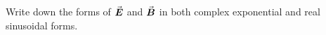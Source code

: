 

\vspace*{\fill}
\centering

Write down the forms of $\va*{E}$ and $\va*{B}$ in both complex exponential and real sinusoidal forms.

\centering
\vspace*{\fill}

